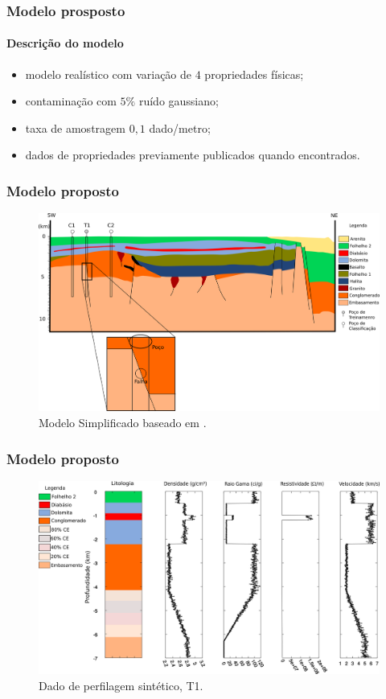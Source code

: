 \documentclass[10pt]{beamer} %
\begin{document}
\begin{frame}
	\frametitle{Modelo prosposto}
	\framesubtitle{Descrição do modelo}
	\begin{itemize}
		\item modelo realístico com variação de $4$ propriedades físicas;
		\pause
		\item contaminação com $5\%$ ruído gaussiano;
		\pause
		\item taxa de amostragem $0,1$ dado/metro;
		\pause
		\item dados de propriedades previamente publicados quando encontrados.
	\end{itemize}
	
\end{frame}


\begin{frame}
	\frametitle{Modelo proposto}
	\begin{figure}[H]
		\centering
			\includegraphics[scale=0.35]{Imagens/Modelo.png}
		\caption{Modelo Simplificado baseado em \cite{Sal2008}.}
		\label{modelo}
	\end{figure}
\end{frame}

\begin{frame}
	\frametitle{Modelo proposto}
	\begin{figure}[H]
		\centering
			\includegraphics[scale=0.37]{Imagens/PocoT1.png}
		\caption{Dado de perfilagem sintético, T1. }
		\label{T1}
	\end{figure}
\end{frame}
\end{document}
